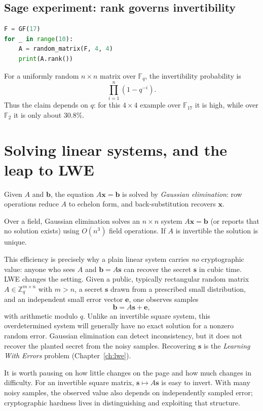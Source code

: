 \subsection{Sage experiment: rank governs invertibility}

\begin{lstlisting}[language=Python]
F = GF(17)
for _ in range(10):
    A = random_matrix(F, 4, 4)
    print(A.rank())
\end{lstlisting}

For a uniformly random $n\times n$ matrix over $\mathbb{F}_q$, the invertibility probability is
\[
\prod_{i=1}^{n}(1-q^{-i}).
\]
Thus the claim depends on $q$: for this $4\times4$ example over $\mathbb{F}_{17}$ it is high, while over $\mathbb{F}_2$ it is only about $30.8\%$.

\section{Solving linear systems, and the leap to LWE}
Given $A$ and $\mathbf{b}$, the equation $A\mathbf{x}=\mathbf{b}$ is solved by \emph{Gaussian elimination}: row operations reduce $A$ to echelon form, and back-substitution recovers $\mathbf{x}$.

\begin{proposition}
Over a field, Gaussian elimination solves an $n\times n$ system $A\mathbf{x}=\mathbf{b}$ (or reports that no solution exists) using $O(n^3)$ field operations. If $A$ is invertible the solution is unique.
\end{proposition}

This efficiency is precisely why a plain linear system carries \emph{no} cryptographic value: anyone who sees $A$ and $\mathbf{b}=A\mathbf{s}$ can recover the secret $\mathbf{s}$ in cubic time. LWE changes the setting. Given a public, typically rectangular random matrix $A\in\mathbb{Z}_q^{m\times n}$ with $m>n$, a secret $\mathbf{s}$ drawn from a prescribed small distribution, and an independent small error vector $\mathbf{e}$, one observes samples
\[
\mathbf{b} = A\mathbf{s} + \mathbf{e},
\]
with arithmetic modulo $q$. Unlike an invertible square system, this overdetermined system will generally have no exact solution for a nonzero random error. Gaussian elimination can detect inconsistency, but it does not recover the planted secret from the noisy samples. Recovering $\mathbf{s}$ is the \emph{Learning With Errors} problem (Chapter~\ref{ch:lwe}).

\begin{remark}
It is worth pausing on how little changes on the page and how much changes in difficulty. For an invertible square matrix, $\mathbf{s}\mapsto A\mathbf{s}$ is easy to invert. With many noisy samples, the observed value also depends on independently sampled error; cryptographic hardness lives in distinguishing and exploiting that structure.
\end{remark}

